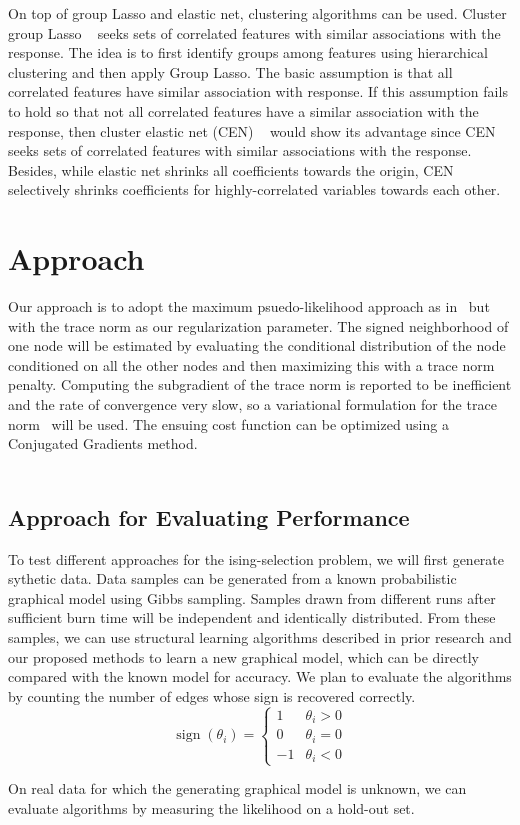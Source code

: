 \documentclass[11pt]{article}
\begin{document}
On top of group Lasso and elastic net, clustering algorithms can be used. Cluster group Lasso ~\cite{Peter2013Cor} seeks sets of correlated features with similar associations with the response. The idea is to first identify groups among features using hierarchical clustering and then apply Group Lasso. The basic assumption is that all correlated features have similar association with response. If this assumption fails to hold so that not all correlated features have a similar association with the response, then cluster elastic net (CEN) ~\cite{Dan2014The} would show its advantage since CEN seeks sets of correlated features with similar associations with the response. Besides, while elastic net shrinks all coefficients towards the origin, CEN selectively shrinks coefficients for highly-correlated variables towards each other.

\section{Approach}
Our approach is to adopt the maximum psuedo-likelihood approach as in~\cite{ravikumar2010high} but with the trace norm as our regularization parameter. The signed neighborhood of one node will be estimated by evaluating the conditional distribution of the node conditioned on all the other nodes and then maximizing this with a trace norm penalty. Computing the subgradient of the trace norm is reported to be inefficient and the rate of convergence very slow, so a variational formulation for the trace norm~\cite{grave2011trace} will be used. The ensuing cost function can be optimized using a Conjugated Gradients method. \\ \\ 
 
\subsection{Approach for Evaluating Performance}
To test different approaches for the ising-selection problem, we will first generate sythetic data. Data samples can be generated from a known probabilistic graphical model using Gibbs sampling. Samples drawn from different runs after sufficient burn time will be independent and identically distributed.  From these samples, we can use structural learning algorithms described in prior research and our proposed methods to learn a new graphical model, which can be directly compared with the known model for accuracy. We plan to evaluate the algorithms by counting the number of edges whose sign is recovered correctly.
$$\operatorname{sign}(\theta_i) = \begin{cases} 1 & \theta_i > 0\\ 0 & \theta_i = 0 \\ -1 & \theta_i < 0 \end{cases}$$

On real data for which the generating graphical model is unknown, we can evaluate algorithms by measuring the likelihood on a hold-out set.


{}

\end{document}
